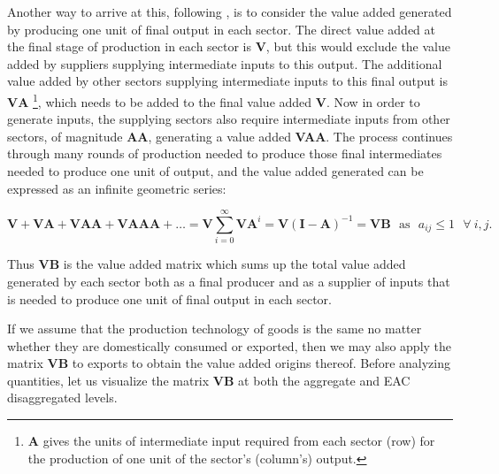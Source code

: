 \documentclass[a4paper]{article}
\begin{document}
Another way to arrive at this, following \citet{wang2013quantifying}, is to consider the value added generated by producing one unit of final output in each sector. The direct value added at the final stage of production in each sector is \textbf{V}, but this would exclude the value added by suppliers supplying intermediate inputs to this output. The additional value added by other sectors supplying intermediate inputs to this final output is $\textbf{V}\textbf{A}$ \footnote{\textbf{A} gives the units of intermediate input required from each sector (row) for the production of one unit of the sector's (column's) output.}, which needs to be added to the final value added \textbf{V}. 
Now in order to generate inputs, the supplying sectors also require intermediate inputs from other sectors, of magnitude \textbf{AA}, generating a value added \textbf{VAA}.  The process continues through many rounds of production needed to produce those final intermediates needed to produce one unit of output, and the value added generated can be expressed as an infinite geometric series:

\begin{equation}
\textbf{V} +\textbf{VA} + \textbf{VAA}+ \textbf{VAAA} + \dots = \textbf{V} \sum_{i=0}^\infty \textbf{VA}^i = \textbf{V}(\textbf{I}-\textbf{A})^{-1} = \textbf{VB}\ \ \ \text{as}\ \ \ a_{ij} \leq 1\ \ \ \forall\ i,j.
\end{equation}

Thus \textbf{VB} is the value added matrix which sums up the total value added generated by each sector both as a final producer and as a supplier of inputs that is needed to produce one unit of final output in each sector.  \newline



If we assume that the production technology of goods is the same no matter whether they are domestically consumed or exported, then we may also apply the matrix \textbf{VB} to exports to obtain the value added origins thereof. Before analyzing quantities, let us visualize the matrix \textbf{VB} at both the aggregate and EAC disaggregated levels. \newline
\end{document}
